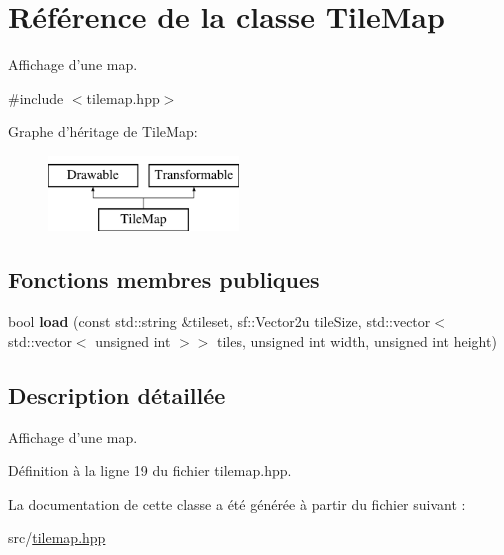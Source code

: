 \hypertarget{classTileMap}{\section{Référence de la classe Tile\+Map}
\label{classTileMap}
}


Affichage d'une map.  




{\ttfamily \#include $<$tilemap.\+hpp$>$}

Graphe d'héritage de Tile\+Map\+:\begin{figure}[H]
\begin{center}
\leavevmode
\includegraphics[height=2.000000cm]{classTileMap}
\end{center}
\end{figure}
\subsection*{Fonctions membres publiques}
\begin{DoxyCompactItemize}
\item 
\hypertarget{classTileMap_ac8af48f82359cb36b2db864c07278756}{bool {\bfseries load} (const std\+::string \&tileset, sf\+::\+Vector2u tile\+Size, std\+::vector$<$ std\+::vector$<$ unsigned int $>$$>$ tiles, unsigned int width, unsigned int height)}\label{classTileMap_ac8af48f82359cb36b2db864c07278756}

\end{DoxyCompactItemize}


\subsection{Description détaillée}
Affichage d'une map. 

Définition à la ligne 19 du fichier tilemap.\+hpp.



La documentation de cette classe a été générée à partir du fichier suivant \+:\begin{DoxyCompactItemize}
\item 
src/\hyperlink{tilemap_8hpp}{tilemap.\+hpp}\end{DoxyCompactItemize}
